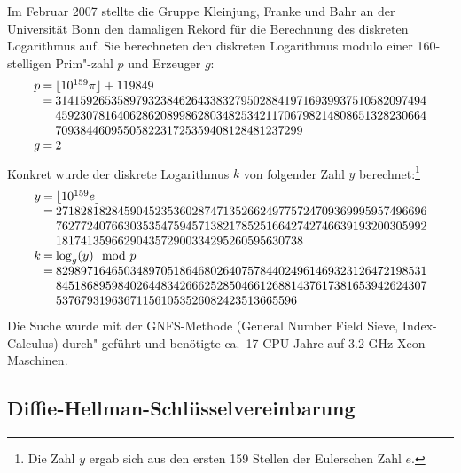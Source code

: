 \begin{refsegment}
Im Februar 2007 stellte die Gruppe Kleinjung, Franke und Bahr an der Universität Bonn
den damaligen Rekord für die Berechnung
des diskreten Logarithmus auf.
Sie berechneten den diskreten Logarithmus modulo einer
160-stelligen Prim"-zahl $p$ und Erzeuger $g$:
$$
\begin{array}{r@{\:}c@{\:}l}
p & = & \lfloor 10^{159}\pi\rfloor + 119849\\
  & = & 314159265358979323846264338327950288419716939937510582097494\\
  &   & 459230781640628620899862803482534211706798214808651328230664\\
  &   & 7093844609550582231725359408128481237299\\
g & = & 2
\end{array}
$$
Konkret wurde der diskrete Logarithmus $k$ von folgender Zahl $y$
berechnet:\footnote{Die Zahl $y$ ergab sich aus den ersten 159 Stellen der
Eulerschen Zahl $e$.}
$$
\begin{array}{r@{\:}c@{\:}l}
y & = & \lfloor 10^{159}e\rfloor\\
  & = & 271828182845904523536028747135266249775724709369995957496696\\
  &   & 762772407663035354759457138217852516642742746639193200305992\\
  &   & 1817413596629043572900334295260595630738\\
k & = & \log_g(y)\mod p\\
  & = & 829897164650348970518646802640757844024961469323126472198531\\
&   & 845186895984026448342666252850466126881437617381653942624307\\
&   & 537679319636711561053526082423513665596
\end{array}
$$
Die Suche wurde mit der GNFS-Methode (General Number Field Sieve,
Index-Calculus)  durch"-geführt und
benötigte ca.~17 CPU-Jahre auf 3.2 GHz Xeon Maschinen.

\subsection[Diffie-Hellman-Schlüsselvereinbarung]
{Diffie-Hellman-Schlüsselvereinbarung\footnotemark}
\hypertarget{DH-KeyExch}{} \label{DH-KeyExch}


\end{refsegment}
